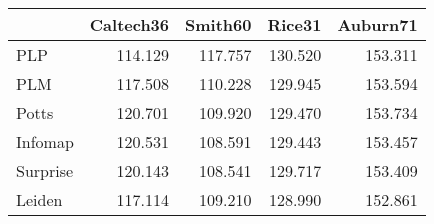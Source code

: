 \begin{tabular}{lrrrr}
\toprule
{} & Caltech36 & Smith60 &  Rice31 & Auburn71 \\
\midrule
PLP      &   114.129 & 117.757 & 130.520 &  153.311 \\
PLM      &   117.508 & 110.228 & 129.945 &  153.594 \\
Potts    &   120.701 & 109.920 & 129.470 &  153.734 \\
Infomap  &   120.531 & 108.591 & 129.443 &  153.457 \\
Surprise &   120.143 & 108.541 & 129.717 &  153.409 \\
Leiden   &   117.114 & 109.210 & 128.990 &  152.861 \\
\bottomrule
\end{tabular}
